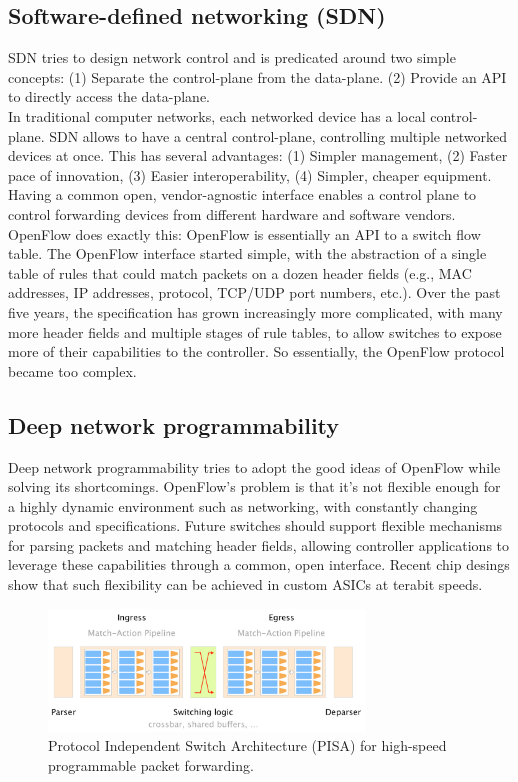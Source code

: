 \documentclass[11pt,oneside,a4paper]{article}
\begin{document}
\subsection{Software-defined networking (SDN)}

SDN tries to design network control and is predicated around two simple concepts: (1) Separate the control-plane from the data-plane. (2) Provide an API to directly access the data-plane.\\
In traditional computer networks, each networked device has a local control-plane. SDN allows to have a central control-plane, controlling multiple networked devices at once. This has several advantages: (1) Simpler management, (2) Faster pace of innovation, (3) Easier interoperability, (4) Simpler, cheaper equipment. Having a common open, vendor-agnostic interface enables a control plane to control forwarding devices from different hardware and software vendors. OpenFlow does exactly this: OpenFlow is essentially an API to a switch flow table. The OpenFlow interface started simple, with the abstraction of a single table of rules that could match packets on a dozen header fields (e.g., MAC addresses, IP addresses, protocol, TCP/UDP port numbers, etc.). Over the past five years, the specification has grown increasingly more complicated, with many more header fields and multiple stages of rule tables, to allow switches to expose more of their capabilities to the controller. So essentially, the OpenFlow protocol became too complex.

\subsection{Deep network programmability}

Deep network programmability tries to adopt the good ideas of OpenFlow while solving its shortcomings. OpenFlow's problem is that it's  not flexible enough for a highly dynamic environment such as networking, with constantly changing protocols and specifications.
Future switches should support flexible mechanisms for parsing packets and matching header fields, allowing controller applications to leverage these capabilities through a common, open interface. Recent chip desings show that such flexibility can be achieved in custom ASICs at terabit speeds.

\begin{figure}[hb]
	\centering
	\includegraphics[width=0.75\textwidth,scale=1]{figures/PISA}
	\caption{Protocol Independent Switch Architecture (PISA) for high-speed programmable packet forwarding. \cite{advnet}}
	\label{fig:PISA}
\end{figure}
\end{document}
